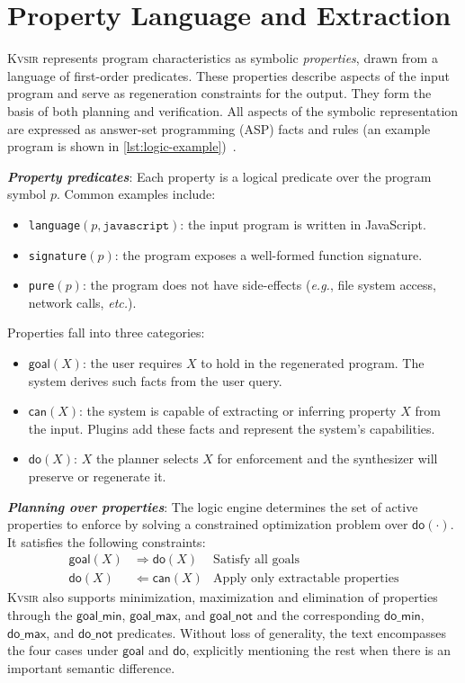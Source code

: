 \documentclass[noacm,sigplan,review]{acmart}
\def\eg{{\em e.g.}, }
\def\etc{{\em etc.}\xspace}
\newcommand{\sys}{{\scshape Kv{\textalpha}sir}\xspace}
\newcommand{\heading}[1]{\vspace{2pt}\noindent\textbf{\emph{#1}}:\enspace}
\begin{document}
\section{Property Language and Extraction}
\label{sec:dsl}

\sys represents program characteristics as symbolic \emph{properties}, drawn from a language of first-order predicates.
These properties describe aspects of the input program and serve as regeneration constraints for the output.
They form the basis of both planning and verification.
All aspects of the symbolic representation are expressed as answer-set programming (ASP) facts and rules (an example program is shown in \cref{lst:logic-example})~\cite{Eiter_2009}.

\heading{Property predicates}
Each property is a logical predicate over the program symbol $p$. Common examples include:
\begin{itemize}
  \item \texttt{language}$(p, \texttt{javascript})$: the input program is written in JavaScript.
  \item \texttt{signature}$(p)$: the program exposes a well-formed function signature.
  \item \texttt{pure}$(p)$: the program does not have side-effects (\eg file system access, network calls, \etc).
\end{itemize}

Properties fall into three categories:
\begin{itemize}
  \item $\mathsf{goal}(X)$: the user requires $X$ to hold in the regenerated program. The system derives such facts from the user query.
  \item $\mathsf{can}(X)$: the system is capable of extracting or inferring property $X$ from the input. Plugins add these facts and represent the system's capabilities.
  \item $\mathsf{do}(X)$: $X$ the planner selects $X$ for enforcement and the synthesizer will preserve or regenerate it. 
\end{itemize}

\heading{Planning over properties}
The logic engine determines the set of active properties to enforce by solving a constrained optimization problem over $\mathsf{do}(\cdot)$. It satisfies the following constraints:
\begin{align*}
  \mathsf{goal}(X) &\Rightarrow \mathsf{do}(X) &\text{Satisfy all goals} \\
  \mathsf{do}(X) &\Leftarrow \mathsf{can}(X) &\text{Apply only extractable properties}
\end{align*}
\sys also supports minimization, maximization and elimination of properties
through the $\mathsf{goal\_min}$, $\mathsf{goal\_max}$, and $\mathsf{goal\_not}$ and the corresponding $\mathsf{do\_min}$, $\mathsf{do\_max}$, and $\mathsf{do\_not}$ predicates.
Without loss of generality, the text encompasses the four cases under $\mathsf{goal}$ and $\mathsf{do}$, explicitly mentioning the rest when there is an important semantic difference.
\end{document}
